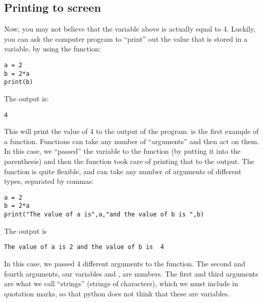 \subsection{Printing to screen}
Now, you may not believe that the variable  above is actually equal to 4. Luckily, you can ask the computer program to ``print'' out the value that is stored in a variable, by using the  function:
\begin{lstlisting}[frame=single] 
a = 2 
b = 2*a
print(b)
\end{lstlisting}
The output is:
\begin{verbatim}
4
\end{verbatim}
This will print the value of 4 to the output of the program.  is the first example of a function. Functions can take any number of ``arguments'' and then act on them. In this case, we ``passed'' the variable  to the function  (by putting it into the parenthesis) and then the function took care of printing that to the output. The  function is quite flexible, and can take any number of arguments of different types, separated by commas:
\begin{lstlisting}[frame=single] 
a = 2 
b = 2*a
print("The value of a is",a,"and the value of b is ",b)
\end{lstlisting}
The output is 
\begin{verbatim}
The value of a is 2 and the value of b is  4
\end{verbatim}
In this case, we passed 4 different arguments to the  function. The second and fourth arguments, our variables  and , are numbers. The first and third arguments are what we call ``strings'' (strings of characters), which we must include in quotation marks, so that python does not think that these are variables.

